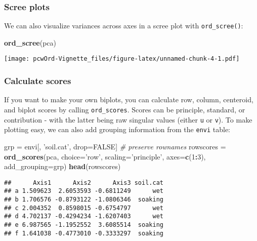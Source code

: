 \documentclass[
]{article}
\newenvironment{Shaded}{\begin{snugshade}}{\end{snugshade}}
\newcommand{\CommentTok}[1]{\textcolor[rgb]{0.56,0.35,0.01}{\textit{#1}}}
\newcommand{\DataTypeTok}[1]{\textcolor[rgb]{0.13,0.29,0.53}{#1}}
\newcommand{\DecValTok}[1]{\textcolor[rgb]{0.00,0.00,0.81}{#1}}
\newcommand{\KeywordTok}[1]{\textcolor[rgb]{0.13,0.29,0.53}{\textbf{#1}}}
\newcommand{\NormalTok}[1]{#1}
\newcommand{\OperatorTok}[1]{\textcolor[rgb]{0.81,0.36,0.00}{\textbf{#1}}}
\newcommand{\OtherTok}[1]{\textcolor[rgb]{0.56,0.35,0.01}{#1}}
\newcommand{\StringTok}[1]{\textcolor[rgb]{0.31,0.60,0.02}{#1}}
\begin{document}
\hypertarget{scree-plots}{%
\subsubsection{Scree plots}\label{scree-plots}}

We can also visualize variances across axes in a scree plot with
\texttt{ord\_scree()}:

\begin{Shaded}
\begin{Highlighting}[]
\KeywordTok{ord_scree}\NormalTok{(pca)}
\end{Highlighting}
\end{Shaded}

\texttt{[image: pcwOrd-Vignette\_files/figure-latex/unnamed-chunk-4-1.pdf]}

\hypertarget{calculate-scores}{%
\subsubsection{Calculate scores}\label{calculate-scores}}

If you want to make your own biplots, you can calculate row, column,
centeroid, and biplot scores by calling \texttt{ord\_scores}. Scores can
be principle, standard, or contribution - with the latter being raw
singular values (either \texttt{\textquotesingle{}u\textquotesingle{}}
or \texttt{\textquotesingle{}v\textquotesingle{}}). To make plotting
easy, we can also add grouping information from the \texttt{envi} table:

\begin{Shaded}
\begin{Highlighting}[]
\NormalTok{grp =}\StringTok{ }\NormalTok{envi[, }\StringTok{'soil.cat'}\NormalTok{, drop=}\OtherTok{FALSE}\NormalTok{] }\CommentTok{# preserve rownames}
\NormalTok{rowscores =}\StringTok{ }\KeywordTok{ord_scores}\NormalTok{(pca, }
                       \DataTypeTok{choice=}\StringTok{'row'}\NormalTok{, }
                       \DataTypeTok{scaling=}\StringTok{'principle'}\NormalTok{, }
                       \DataTypeTok{axes=}\KeywordTok{c}\NormalTok{(}\DecValTok{1}\OperatorTok{:}\DecValTok{3}\NormalTok{), }
                       \DataTypeTok{add_grouping=}\NormalTok{grp)}
\KeywordTok{head}\NormalTok{(rowscores)}
\end{Highlighting}
\end{Shaded}

\begin{verbatim}
##      Axis1      Axis2      Axis3 soil.cat
## a 1.509623  2.6053593 -0.6811249      wet
## b 1.706576 -0.8793122 -1.0806346  soaking
## c 2.004352  0.8598015 -0.6754797      wet
## d 4.702137 -0.4294234 -1.6207403      wet
## e 6.987565 -1.1952552  3.6085514  soaking
## f 1.641038 -0.4773010 -0.3333297  soaking
\end{verbatim}
\end{document}
